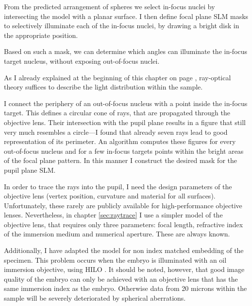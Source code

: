 From the predicted arrangement of spheres we select in-focus nuclei by
intersecting the model with a planar surface. I then define focal
plane SLM masks to selectively illuminate each of the in-focus nuclei,
by drawing a bright disk in the appropriate position.

Based on such a mask, we can determine which angles can illuminate the
in-focus target nucleus, without exposing out-of-focus nuclei.

As I already explained at the beginning of this chapter on page
\pageref{sec:ray-valid}, ray-optical theory suffices to describe the
light distribution within the sample.

I connect the periphery of an out-of-focus nucleus with a point inside
the in-focus target. This defines a circular cone of rays, that are
propagated through the objective lens. Their intersection with the
pupil plane results in a figure that still very much resembles a
circle---I found that already seven rays lead to good representation
of its perimeter.  An algorithm computes these figures for every
out-of-focus nucleus and for a few in-focus targets points within the
bright areas of the focal plane pattern. In this manner I construct
the desired mask for the pupil plane SLM.

In order to trace the rays into the pupil, I need the design
parameters of the objective lens (vertex position, curvature and
material for all surfaces). Unfortunately, these rarely are publicly
available for high-performance objective lenses. Nevertheless, in
chapter \ref{sec:raytrace} I use a simpler model of the objective lens, that
requires only three parameters: focal length, refractive index of the
immersion medium and numerical aperture. These are always known.

Additionally, I have adapted the model for non index matched embedding
of the specimen. This problem occurs when the embryo is illuminated
with an oil immersion objective, using HILO \citep{Tokunaga2008}. It should be
noted, however, that good image quality of the embryo can only be
achieved with an objective lens that has the same immersion index as
the embryo. Otherwise data from 20 microns within the sample will be
severely deteriorated by spherical aberrations.

